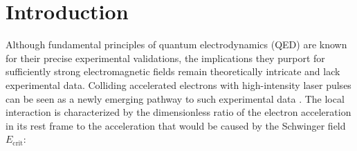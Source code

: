 \documentclass[%
 reprint,
 amsmath,amssymb,
 aps,
]{revtex4-2}
\begin{document}

\maketitle


\section{\label{sec:Introduction} Introduction}

Although fundamental principles of quantum electrodynamics (QED) are known for their precise experimental validations, the implications they purport for sufficiently strong electromagnetic fields remain theoretically intricate and lack experimental data. Colliding accelerated electrons with high-intensity laser pulses can be seen as a newly emerging pathway to such experimental data \cite{poder2018experimental,cole2018experimental,abramowicz2021conceptual,yakimenko2019facet}. The local interaction is characterized by the dimensionless ratio of the electron acceleration in its rest frame to the acceleration that would be caused by the Schwinger field $E_\text{crit}$:
\end{document}
